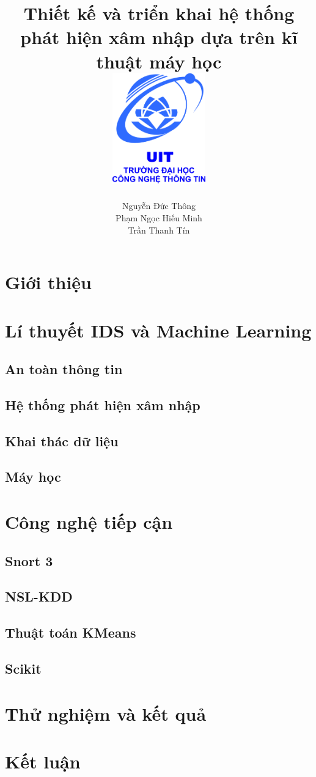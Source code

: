 \documentclass[12pt,twoside]{report}
\title{
    {Thiết kế và triển khai hệ thống phát hiện xâm nhập dựa trên kĩ thuật máy học}\\
    {\includegraphics[width=4cm]{logo}}
}
\author{
    Nguyễn Đức Thông
    \\
    Phạm Ngọc Hiếu Minh
    \\
    Trần Thanh Tín
}
\begin{document}
\maketitle
\newpage
\tableofcontents
\listoffigures
\newpage

    \chapter{Giới thiệu}
    
    \newpage
    \chapter{Lí thuyết IDS và Machine Learning}
    \section{An toàn thông tin}
    
    \section{Hệ thống phát hiện xâm nhập}
    
    \section{Khai thác dữ liệu}
    
    \section{Máy học}
    
    \newpage
    \chapter{Công nghệ tiếp cận}
    \section{Snort 3}
    
    \section{NSL-KDD}
    
    \section{Thuật toán KMeans}
    
    \section{Scikit}
    
    \newpage
    \chapter{Thử nghiệm và kết quả}
    
    \newpage
    \chapter{Kết luận}
    

\newpage


\end{document}
